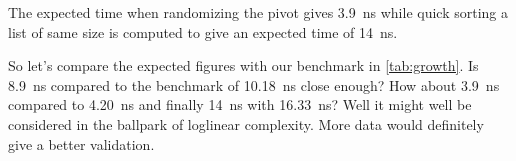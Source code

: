\documentclass[a4paper, 11pt]{article}
\begin{document}
    The expected time when randomizing the pivot gives \SI{3.9}{\nano\second}
    while quick sorting a list of same size is computed to give an 
    expected time of \SI{14}{\nano\second}.

    So let's compare the expected figures with our benchmark in \autoref{tab:growth}. 
    Is \SI{8.9}{\nano\second} compared to the benchmark of \SI{10.18}{\nano\second} close enough? 
    How about \SI{3.9}{\nano\second} compared to \SI{4.20}{\nano\second} and finally \SI{14}{\nano\second} with \SI{16.33}{\nano\second}? 
    Well it might well be considered in the ballpark of loglinear complexity. 
    More data would definitely give a better validation.  
\printbibliography
\end{document}
